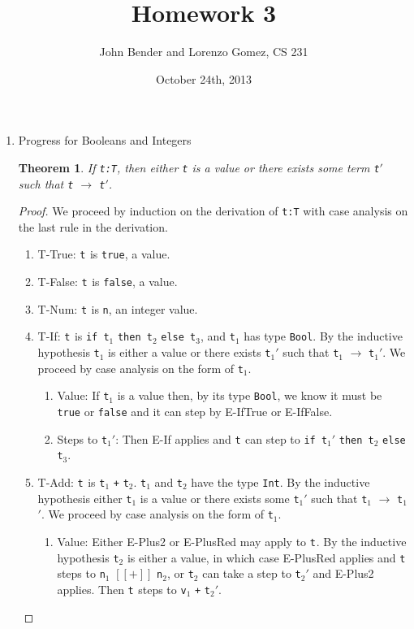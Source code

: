 \documentclass{article}
\title{Homework 3}
\author{John Bender and Lorenzo Gomez, CS 231}
\date{October 24th, 2013}
\newcommand{\step}[2]{{\tt #1} $\longrightarrow$ {\tt #2}}
\newcommand{\term}[1]{{\tt t$_{#1}$}}
\newtheorem{theorem}{Theorem}
\begin{document}
\maketitle

\begin{enumerate}
  \item Progress for Booleans and Integers

    \begin{theorem}
      If \verb|t:T|, then either \verb|t| is a value or there exists some term \verb|t|$'$ such that \verb|t| $\longrightarrow$ \verb|t|$'$.
    \end{theorem}

    \begin{proof}
      We proceed by induction on the derivation of \verb|t:T| with case analysis on the last rule in the derivation.
      \begin{enumerate}
        \item T-True: \term{} is \verb|true|, a value.
        \item T-False: \term{} is \verb|false|, a value.
        \item T-Num: \term{} is \verb|n|, an integer value.
        \item T-If: \term{} is \verb|if t|$_1$ \verb|then t|$_2$ \verb|else t|$_3$, and \term{1} has type \verb|Bool|. By the inductive hypothesis \term{1} is either a value or there exists \term{1}$'$ such that \step{t$_1$}{\term{1}$'$}. We proceed by case analysis on the form of \term{1}.
          \begin{enumerate}
            \item Value: If \term{1} is a value then, by its type \verb|Bool|, we know it must be \verb|true| or \verb|false| and it can step by E-IfTrue or E-IfFalse.
            \item Steps to \term{1}$'$: Then E-If applies and \term{} can step to \verb|if t|$_1'$ \verb|then t|$_2$ \verb|else t|$_3$.
          \end{enumerate}
        \item T-Add: \term{} is \term{1} \verb|+| \term{2}. \term{1} and \term{2} have the type \verb|Int|. By the inductive hypothesis either \term{1} is a value or there exists some \term{1}$'$ such that \step{t$_1$}{\term{1}$'$}. We proceed by case analysis on the form of \term{1}.
          \begin{enumerate}
            \item Value: Either E-Plus2 or E-PlusRed may apply to \term{}. By the inductive hypothesis \term{2} is either a value, in which case E-PlusRed applies and \term{} steps to \verb|n|$_1$ $[[+]]$ \verb|n|$_2$, or \term{2} can take a step to \term{2}$'$ and E-Plus2 applies. Then \term{} steps to \verb|v|$_1$ \verb|+| \term{2}$'$.

\end{enumerate}
\end{enumerate}
\end{proof}
\end{enumerate}
\end{document}
